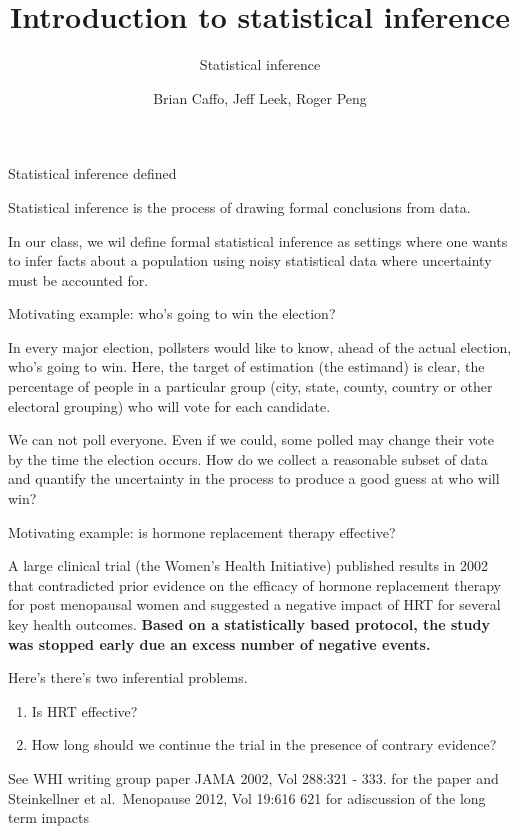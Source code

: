 \documentclass[
  ignorenonframetext,
]{beamer}
\title{Introduction to statistical inference}
\subtitle{Statistical inference}
\author{Brian Caffo, Jeff Leek, Roger Peng}
\date{}
\providecommand{\tightlist}{%
  \setlength{\itemsep}{0pt}\setlength{\parskip}{0pt}}
\begin{document}
\frame{\titlepage}

\begin{frame}
  \tableofcontents[hideallsubsections]
\end{frame}
\begin{frame}{Statistical inference defined}
\protect\hypertarget{statistical-inference-defined}{}

Statistical inference is the process of drawing formal conclusions from
data.

In our class, we wil define formal statistical inference as settings
where one wants to infer facts about a population using noisy
statistical data where uncertainty must be accounted for.

\end{frame}

\begin{frame}{Motivating example: who's going to win the election?}
\protect\hypertarget{motivating-example-whos-going-to-win-the-election}{}

In every major election, pollsters would like to know, ahead of the
actual election, who's going to win. Here, the target of estimation (the
estimand) is clear, the percentage of people in a particular group
(city, state, county, country or other electoral grouping) who will vote
for each candidate.

We can not poll everyone. Even if we could, some polled may change their
vote by the time the election occurs. How do we collect a reasonable
subset of data and quantify the uncertainty in the process to produce a
good guess at who will win?

\end{frame}

\begin{frame}{Motivating example: is hormone replacement therapy
effective?}
\protect\hypertarget{motivating-example-is-hormone-replacement-therapy-effective}{}

A large clinical trial (the Women's Health Initiative) published results
in 2002 that contradicted prior evidence on the efficacy of hormone
replacement therapy for post menopausal women and suggested a negative
impact of HRT for several key health outcomes. \textbf{Based on a
statistically based protocol, the study was stopped early due an excess
number of negative events.}

Here's there's two inferential problems.

\begin{enumerate}
\tightlist
\item
  Is HRT effective?
\item
  How long should we continue the trial in the presence of contrary
  evidence?
\end{enumerate}

See WHI writing group paper JAMA 2002, Vol 288:321 - 333. for the paper
and Steinkellner et al.~Menopause 2012, Vol 19:616 621 for adiscussion
of the long term impacts

\end{frame}
\end{document}
